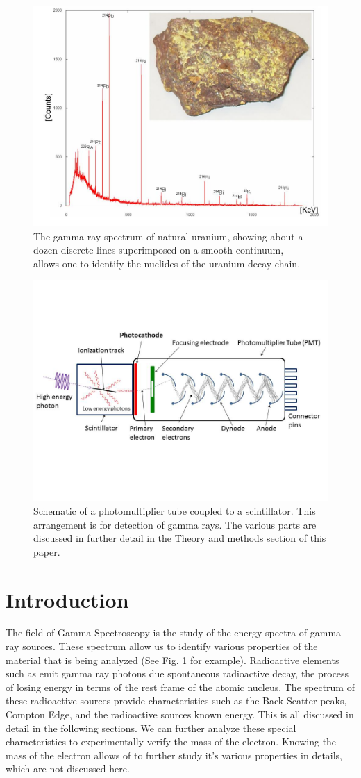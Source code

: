 \documentclass[%
 reprint,
 amsmath,amssymb,
 aps,
]{revtex4-1}
\begin{document}
\begin{figure}[ht!]
\includegraphics[width = .5\textwidth ,keepaspectratio,frame]{spec.jpg}
\caption{ The gamma-ray spectrum of natural uranium, showing about a dozen discrete lines superimposed on a smooth continuum, \\
allows one to identify the nuclides of the uranium decay chain.\cite{WS}}
\end{figure}
\begin{figure}[!ht]

\includegraphics[width = .5\textwidth ,keepaspectratio,frame]{PMT.jpg}
\caption{ Schematic of a photomultiplier tube coupled to a scintillator. This arrangement is for detection of gamma rays.\cite{Sim} The various parts are discussed in further detail in the Theory and methods section of this paper.}

\end{figure}

\section{\label{sec:level1}Introduction}
 The field of Gamma Spectroscopy is the study of the energy spectra of gamma ray sources\cite{WS}. These spectrum allow us to identify various properties of the material that is being analyzed (See Fig. 1 for example). Radioactive elements such as \cs emit gamma ray photons due spontaneous radioactive decay, the process of losing energy in terms of the rest frame of the atomic nucleus. The spectrum of these radioactive sources provide characteristics such as the Back Scatter peaks, Compton Edge, and the radioactive sources known energy. This is all discussed in detail in the following sections. We can further analyze these special characteristics to experimentally verify the mass of the electron. Knowing the mass of the electron allows of to further study it's various properties in details, which are not discussed here.\\
\end{document}
